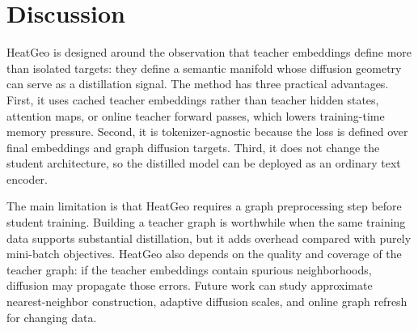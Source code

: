 \section{Discussion}

HeatGeo is designed around the observation that teacher embeddings define more than isolated targets: they define a semantic manifold whose diffusion geometry can serve as a distillation signal. The method has three practical advantages. First, it uses cached teacher embeddings rather than teacher hidden states, attention maps, or online teacher forward passes, which lowers training-time memory pressure. Second, it is tokenizer-agnostic because the loss is defined over final embeddings and graph diffusion targets. Third, it does not change the student architecture, so the distilled model can be deployed as an ordinary text encoder.

The main limitation is that HeatGeo requires a graph preprocessing step before student training. Building a teacher graph is worthwhile when the same training data supports substantial distillation, but it adds overhead compared with purely mini-batch objectives. HeatGeo also depends on the quality and coverage of the teacher graph: if the teacher embeddings contain spurious neighborhoods, diffusion may propagate those errors. Future work can study approximate nearest-neighbor construction, adaptive diffusion scales, and online graph refresh for changing data.
